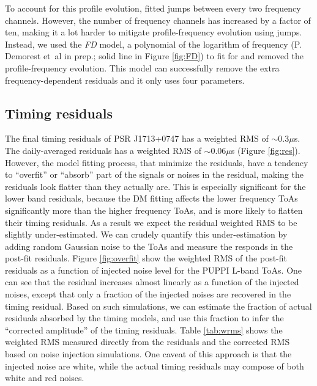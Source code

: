 To account for this profile evolution, \citet{sns+05} fitted jumps between every two frequency channels. However, the number of frequency channels has increased by a factor of ten, making it a lot harder to mitigate profile-frequency evolution using jumps. 
Instead, we used the {\it FD} model, a polynomial of the logarithm of
frequency (P. Demorest et~al in prep.; solid line in Figure \ref{fig:FD}) to fit for and removed the profile-frequency evolution. This model can successfully remove the extra frequency-dependent residuals and it only uses four parameters.



\subsection{Timing residuals}
\label{sec:res}

The final timing residuals of PSR J1713+0747 has a weighted RMS of $\sim 0.3\mu$s. The daily-averaged residuals has a weighted RMS of $\sim 0.06\mu$s (Figure \ref{fig:res}).
However, the model fitting process, that minimize the residuals, have a tendency to ``overfit'' or 
``absorb'' part of the signals or noises in the residual, making the residuals
look flatter than they actually are. 
This is especially significant for the lower band residuals, because
the DM fitting affects the lower frequency ToAs significantly more than the
higher frequency ToAs, and is more likely to flatten their timing residuals. 
As a result we expect the residual weighted RMS to be slightly under-estimated. We can crudely quantify
this under-estimation by adding random Gaussian noise to the ToAs and
measure the responds in the post-fit residuals. Figure \ref{fig:overfit} show
the weighted RMS of the post-fit residuals as a function of injected noise level for the PUPPI L-band ToAs. 
One can see that the residual increases almost linearly as a function of the
injected noises, except that only a fraction of the injected noises are
recovered in the timing residual.
Based on such simulations, we
can estimate the fraction of actual residuals absorbed by the timing models, and use this fraction to infer the ``corrected amplitude'' of the timing residuals. 
Table \ref{tab:wrms} shows the weighted RMS measured directly from the residuals 
and the corrected RMS based on noise injection simulations. One caveat 
of this approach is that the injected noise are white, while the actual timing
residuals may compose of both white and red noises. 


